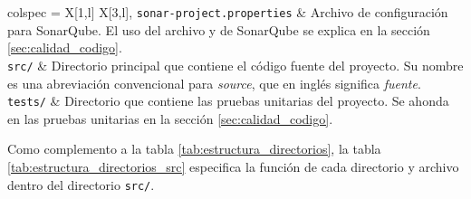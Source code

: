 \begin{longtblr}[
		caption = {Estructura de archivos y directorios del proyecto},
		label = {tab:estructura_directorios},
	]{
		colspec = {X[1,l] X[3,l]},
	}
	\lstinline|sonar-project|\newline\lstinline|.properties| & Archivo de configuración para \gls{SonarQube}. El uso del archivo y de \gls{SonarQube} se explica en la sección \ref{sec:calidad_codigo}.                                                                                                                                                                                                                                                                                                                                                                                    \\
	\lstinline|src/|                                         & Directorio principal que contiene el código fuente del proyecto. Su nombre es una abreviación convencional para \textit{source}, que en inglés significa \textit{fuente}.                                                                                                                                                                                                                                                                                                                                                    \\
	\lstinline|tests/|                                       & Directorio que contiene las \gls{pruebas unitarias} del proyecto. Se ahonda en las \gls{pruebas unitarias} en la sección \ref{sec:calidad_codigo}.                                                                                                                                                                                                                                                                                                                                                                           \\
	\hline
\end{longtblr}

Como complemento a la tabla \ref{tab:estructura_directorios}, la tabla \ref{tab:estructura_directorios_src} especifica la función de cada directorio y archivo dentro del directorio \lstinline|src/|.


